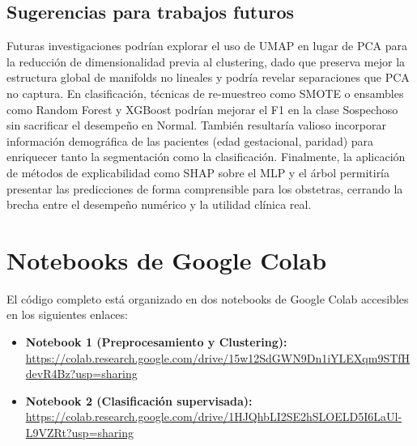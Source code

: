 \documentclass[12pt,letterpaper]{article}
\begin{document}
\subsection{Sugerencias para trabajos futuros}
 
Futuras investigaciones podrían explorar el uso de UMAP en lugar de PCA para la
reducción de dimensionalidad previa al clustering, dado que preserva mejor la estructura
global de manifolds no lineales y podría revelar separaciones que PCA no captura. En
clasificación, técnicas de re-muestreo como SMOTE o ensambles como Random Forest y
XGBoost podrían mejorar el F1 en la clase Sospechoso sin sacrificar el desempeño en
Normal. También resultaría valioso incorporar información demográfica de las pacientes
(edad gestacional, paridad) para enriquecer tanto la segmentación como la clasificación.
Finalmente, la aplicación de métodos de explicabilidad como SHAP sobre el MLP y el
árbol permitiría presentar las predicciones de forma comprensible para los obstetras,
cerrando la brecha entre el desempeño numérico y la utilidad clínica real.

\section{Notebooks de Google Colab}

El código completo está organizado en dos notebooks de Google Colab accesibles en los
siguientes enlaces:

\begin{itemize}
  \item \textbf{Notebook 1 (Preprocesamiento y Clustering):}
  \url{https://colab.research.google.com/drive/15w12SdGWN9Dn1iYLEXqm9STfHdevR4Bz?usp=sharing}

  \item \textbf{Notebook 2 (Clasificación supervisada):}
  \url{https://colab.research.google.com/drive/1HJQhbLI2SE2hSLOELD5I6LaUl-L9VZRt?usp=sharing}
\end{itemize}
\end{document}

